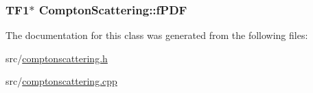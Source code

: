 \subsubsection[{\texorpdfstring{f\+P\+DF}{fPDF}}]{\setlength{\rightskip}{0pt plus 5cm}T\+F1$\ast$ Compton\+Scattering\+::f\+P\+DF}\hypertarget{classComptonScattering_add23479fa60d3dab59f9baa2d2dcf76f}{}\label{classComptonScattering_add23479fa60d3dab59f9baa2d2dcf76f}


The documentation for this class was generated from the following files\+:\begin{DoxyCompactItemize}
\item 
src/\hyperlink{comptonscattering_8h}{comptonscattering.\+h}\item 
src/\hyperlink{comptonscattering_8cpp}{comptonscattering.\+cpp}\end{DoxyCompactItemize}
